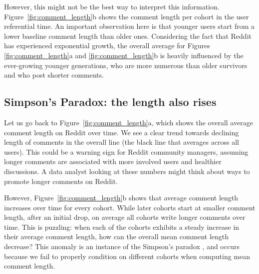 \documentclass[10pt, oneside, onecolumn]{article}
\begin{document}
However, this might not be the best way to interpret this information. Figure~\ref{fig:comment_length}b shows the comment length per cohort in the user referential time. An important observation here is that younger users start from a lower baseline comment length than older ones. Considering the fact that Reddit has experienced exponential growth, the overall average for Figures \ref{fig:comment_length}a and \ref{fig:comment_length}b is heavily influenced by the ever-growing younger generations, who are more numerous than older survivors and who post shorter comments. 

\subsection{Simpson's Paradox: the length also rises}

Let us go back to Figure~\ref{fig:comment_length}a, which shows the overall average comment length on Reddit over time. We see a clear trend towards declining length of comments in the overall line (the black line that averages across all users). This could be a warning sign for Reddit community managers, assuming longer comments are associated with more involved users and healthier discussions. A data analyst looking at these numbers might think about ways to promote longer comments on Reddit. 

However, Figure~\ref{fig:comment_length}b shows that average comment length increases over time for every cohort. While later cohorts start at smaller comment length, after an initial drop, on average all cohorts write longer comments over time.  This is puzzling: when each of the cohorts exhibits a steady increase in their average comment length, how can the overall mean comment length decrease?  This anomaly is an instance of the Simpson's paradox \cite{simpson1951}, and occurs because we fail to properly condition on different cohorts when computing mean comment length. 
\end{document}
